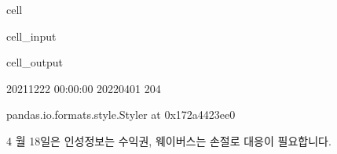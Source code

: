 \documentclass[letterpaper,10pt,english]{jupyterBook}
\begin{document}
\begin{sphinxuseclass}{cell}\begin{sphinxVerbatimInput}

\begin{sphinxuseclass}{cell_input}
\begin{sphinxVerbatim}[commandchars=\\\{\}]
  

    
         
\end{sphinxVerbatim}

\end{sphinxuseclass}\end{sphinxVerbatimInput}
\begin{sphinxVerbatimOutput}

\begin{sphinxuseclass}{cell_output}
\begin{sphinxVerbatim}[commandchars=\\\{\}]
2021\PYGZhy{}12\PYGZhy{}22 00:00:00 2022\PYGZhy{}04\PYGZhy{}01
204
\end{sphinxVerbatim}

\begin{sphinxVerbatim}[commandchars=\\\{\}]
\PYGZlt{}pandas.io.formats.style.Styler at 0x172a4423ee0\PYGZgt{}
\end{sphinxVerbatim}

\end{sphinxuseclass}\end{sphinxVerbatimOutput}

\end{sphinxuseclass}
\sphinxAtStartPar
 4 월 18일은 인성정보는 수익권, 웨이버스는 손절로 대응이 필요합니다.
\end{document}
